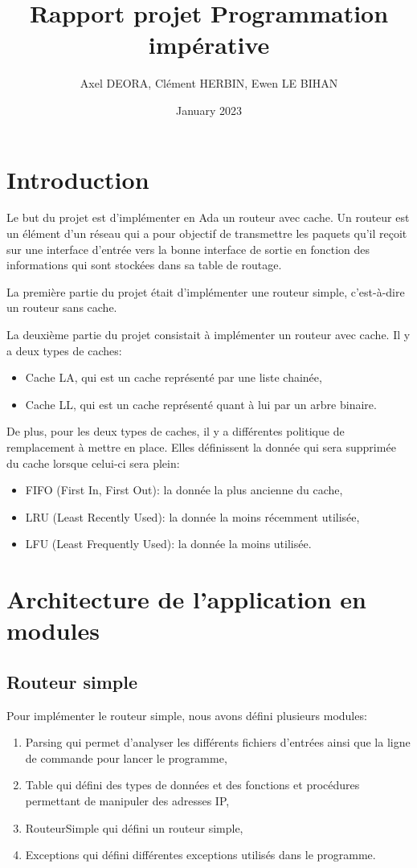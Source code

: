 \documentclass{article}
\title{Rapport projet Programmation impérative}
\author{Axel DEORA, Clément HERBIN, Ewen LE BIHAN}
\date{January 2023}
\begin{document}
\maketitle

\section{Introduction}
Le but du projet est d'implémenter en Ada un routeur avec cache. Un routeur est un élément d'un réseau qui a pour objectif de transmettre les paquets qu'il reçoit sur une interface d'entrée vers la bonne interface de sortie en fonction des informations qui sont stockées dans sa table de routage.\par
La première partie du projet était d'implémenter une routeur simple, c'est-à-dire un routeur sans cache.\par  
La deuxième partie du projet consistait à implémenter un routeur avec cache. Il y a deux types de caches:
\begin{itemize}
    \item Cache LA, qui est un cache représenté par une liste chainée,
    \item Cache LL, qui est un cache représenté quant à lui par un arbre binaire.
\end{itemize}\par
De plus, pour les deux types de caches, il y a différentes politique de remplacement à mettre en place. Elles définissent la donnée qui sera supprimée du cache lorsque celui-ci sera plein:
\begin{itemize}
    \item FIFO (First In, First Out): la donnée la plus ancienne du cache,
    \item LRU (Least Recently Used): la donnée la moins récemment utilisée,
    \item LFU (Least Frequently Used): la donnée la moins utilisée.
\end{itemize}
\newpage

\tableofcontents

\newpage

\section{Architecture de l'application en modules}

\subsection{Routeur simple}
Pour implémenter le routeur simple, nous avons défini plusieurs modules:
\begin{enumerate}
    \item Parsing qui permet d'analyser les différents fichiers d'entrées ainsi que la ligne de commande pour lancer le programme,
    \item Table qui défini des types de données et des fonctions et procédures permettant de manipuler des adresses IP,
    \item RouteurSimple qui défini un routeur simple,
    \item Exceptions qui défini différentes exceptions utilisés dans le programme.
\end{enumerate}
\end{document}
